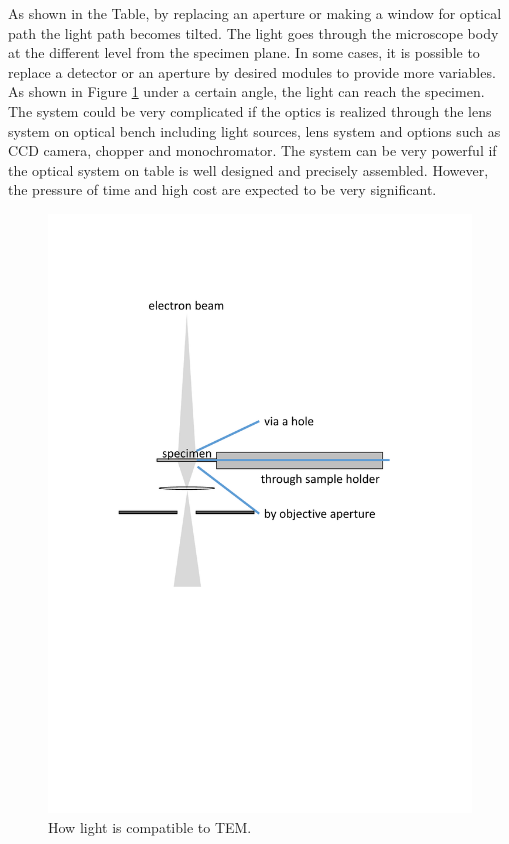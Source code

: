 As shown in the Table, by replacing an aperture or making a window for optical path the light path becomes tilted. The light goes through the microscope body at the different level from the specimen plane. In some cases, it is possible to replace a detector or an aperture by desired modules to provide more variables. As shown in Figure \ref{fig:2_1} under a certain angle, the light can reach the specimen. The system could be very complicated if the optics is realized through the lens system on optical bench including light sources, lens system and options such as CCD camera, chopper and monochromator. The system can be very powerful if the optical system on table is well designed and precisely assembled. However, the pressure of time and high cost are expected to be very significant. \\

\begin{figure}  
\centering
\includegraphics[width=320pt]{figures/figure2_1}
\caption[Putting light into TEM.]{How light is compatible to TEM.
\label{fig:2_1}}
\end{figure}

